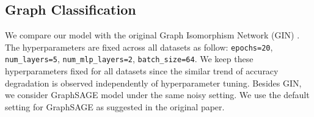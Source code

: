 \documentclass{article} %
\begin{document}
\subsection{Graph Classification}

We compare our model with the original Graph Isomorphism Network (GIN) \citep{xu2018how}.
The hyperparameters are fixed across all datasets as follow: \texttt{epochs=20}, 
\texttt{num\_layers=5}, \texttt{num\_mlp\_layers=2}, \texttt{batch\_size=64}.
We keep these hyperparameters fixed for all datasets since the similar 
trend of accuracy degradation is observed independently of hyperparameter tuning. 
Besides GIN, we consider GraphSAGE model \citep{hamilton2017inductive} under the same noisy 
setting. We use the default setting for GraphSAGE as suggested in the original paper.

\begin{table}[h]
  \centering
  \caption{Classification results at symmetric noise, when $n=0.2$ (80\% data has correct labels).
  We calculate the mean and std of accuracy score on test data for 10 runs each configuration. Bold font indicates
  improvement compared to the original model.}
  \label{tab:1}
  \begin{center}
\end{center}
\vspace{-1em}
\end{table}
\end{document}
